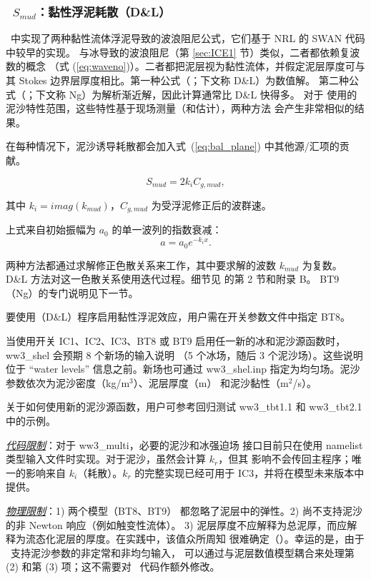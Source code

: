 \vsssub
\subsubsection{~$S_{mud}$：黏性浮泥耗散（D\&L）} \label{sec:BT8}
\vsssub


\noindent
\ws\ 中实现了两种黏性流体浮泥导致的波浪阻尼公式，它们基于 NRL 的 SWAN 代码中较早的实现。
与冰导致的波浪阻尼（第 \ref{sec:ICE1} 节）类似，二者都依赖复波数的概念
（式 (\ref{eq:waveno})）。二者都把泥层视为黏性流体，并假定泥层厚度可与其 Stokes
边界层厚度相比。第一种公式（\cite{art:DL78}；下文称 D\&L）为数值解。
第二种公式（\cite{art:Ng00}；下文称 Ng）为解析渐近解，因此计算通常比 D\&L 快得多。
对于 \cite{art:RH09} 使用的泥沙特性范围，这些特性基于现场测量（和估计），两种方法
会产生非常相似的结果。

在每种情况下，泥沙诱导耗散都会加入式~(\ref{eq:bal_plane}) 中其他源/汇项的贡献。

\begin{equation}\label{eq:dmud1}
  {S_{mud}} = 2  k_i {C_{g,mud}},
\end{equation}

\noindent
其中 $k_i=imag({k_{mud}})$，${C_{g,mud}}$ 为受浮泥修正后的波群速。

上式来自初始振幅为 $a_0$ 的单一波列的指数衰减：
\begin{equation}\label{eq:dmud2}
 a=a_0e^{-k_ix}.
\end{equation}

\noindent
两种方法都通过求解修正色散关系来工作，其中要求解的波数 ${k_{mud}}$ 为复数。
D\&L 方法对这一色散关系使用迭代过程。细节见 \cite{art:DL78} 的第 2 节和附录 B。
{\code BT9}（Ng）的专门说明见下一节。

要使用（D\&L）程序启用黏性浮泥效应，用户需在开关参数文件中指定 {\code BT8}。

当使用开关 {\code IC1}、{\code IC2}、{\code IC3}、{\code BT8} 或 {\code BT9}
启用任一新的冰和泥沙源函数时，{\file ww3\_shel} 会预期 8 个新场的输入说明
（5 个冰场，随后 3 个泥沙场）。这些说明位于 ``water levels'' 信息之前。新场也可通过
{\file ww3\_shel.inp} 指定为均匀场。泥沙参数依次为泥沙密度（kg/m$^3$）、泥层厚度（m）
和泥沙黏性（m$^2$/s）。

关于如何使用新的泥沙源函数，用户可参考回归测试 {\file ww3\_tbt1.1} 和
{\file ww3\_tbt2.1} 中的示例。

\textrm{\textit{\underline{代码限制}}}：对于 {\file ww3\_multi}，必要的泥沙和冰强迫场
接口目前只在使用 namelist 类型输入文件时实现。对于泥沙，虽然会计算 ${k_r}$，但其
影响不会传回主程序；唯一的影响来自 ${k_i}$（耗散）。${k_r}$ 的完整实现已经可用于
IC3，并将在模型未来版本中提供。

\textrm{\textit{\underline{物理限制}}}：1) 两个模型（{\code BT8}、{\code BT9}）
都忽略了泥层中的弹性。2) 尚不支持泥沙的非 Newton 响应（例如触变性流体）。
3) 泥层厚度不应解释为总泥厚，而应解释为流态化泥层的厚度。在实践中，该值众所周知
很难确定（\cite{art:RH09}）。幸运的是，由于 \ws\ 支持泥沙参数的非定常和非均匀输入，
可以通过与泥层数值模型耦合来处理第 (2) 和第 (3) 项；这不需要对 \ws\ 代码作额外修改。
